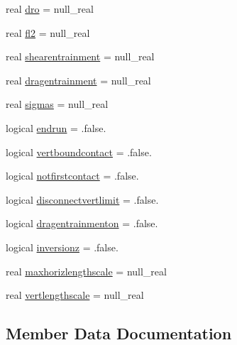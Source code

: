 \begin{DoxyCompactItemize}
\item 
real \mbox{\hyperlink{structmodulejet_1_1t__evolution_a763acf1d4f248e51db7b1866c706a072}{dro}} = null\+\_\+real
\item 
real \mbox{\hyperlink{structmodulejet_1_1t__evolution_a63b561e1aab480defabd1172ee714df8}{fl2}} = null\+\_\+real
\item 
real \mbox{\hyperlink{structmodulejet_1_1t__evolution_a7313595d8605605718f9c107905c9c82}{shearentrainment}} = null\+\_\+real
\item 
real \mbox{\hyperlink{structmodulejet_1_1t__evolution_a773adfec50f0af2ec833c7626dae6a2f}{dragentrainment}} = null\+\_\+real
\item 
real \mbox{\hyperlink{structmodulejet_1_1t__evolution_ab84abf1c2fdc90320958b7c10fea65df}{sigmas}} = null\+\_\+real
\item 
logical \mbox{\hyperlink{structmodulejet_1_1t__evolution_a231f13c08ad331e6d39a6d6de8f843a2}{endrun}} = .false.
\item 
logical \mbox{\hyperlink{structmodulejet_1_1t__evolution_aa128df76a671ee0f9d5f8160c214d884}{vertboundcontact}} = .false.
\item 
logical \mbox{\hyperlink{structmodulejet_1_1t__evolution_a93c181c71ea5c9fd7cf414355a855d60}{notfirstcontact}} = .false.
\item 
logical \mbox{\hyperlink{structmodulejet_1_1t__evolution_ac1371c87cfb01978afdd1d56af92b810}{disconnectvertlimit}} = .false.
\item 
logical \mbox{\hyperlink{structmodulejet_1_1t__evolution_ad9139e80e385fecf00832b3737d1bb69}{dragentrainmenton}} = .false.
\item 
logical \mbox{\hyperlink{structmodulejet_1_1t__evolution_ae3542db4189ce9e1bb0f0b6da56400c7}{inversionz}} = .false.
\item 
real \mbox{\hyperlink{structmodulejet_1_1t__evolution_ad8407dc174c753dd9e12529a3f73630c}{maxhorizlengthscale}} = null\+\_\+real
\item 
real \mbox{\hyperlink{structmodulejet_1_1t__evolution_a5db3278eef611020637820ca92be2fae}{vertlengthscale}} = null\+\_\+real
\end{DoxyCompactItemize}


\subsection{Member Data Documentation}
\mbox{\label{structmodulejet_1_1t__evolution_a6935300a54705136b8a5fd8bf6681eea}} 
